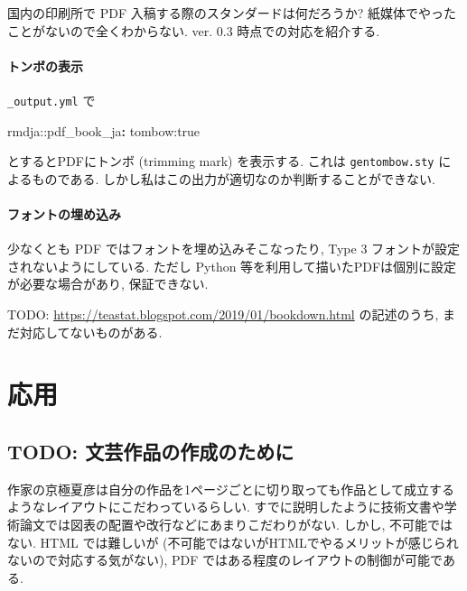 \documentclass[
  nomag]{bxjsbook}
\newenvironment{Shaded}{\begin{snugshade}}{\end{snugshade}}
\newcommand{\AttributeTok}[1]{\textcolor[rgb]{0.77,0.63,0.00}{#1}}
\newcommand{\FunctionTok}[1]{\textcolor[rgb]{0.00,0.00,0.00}{#1}}
\newcommand{\KeywordTok}[1]{\textcolor[rgb]{0.13,0.29,0.53}{\textbf{#1}}}
\theoremstyle{definition}
\theoremstyle{definition}
\theoremstyle{definition}
\theoremstyle{remark}
\begin{document}
国内の印刷所で PDF 入稿する際のスタンダードは何だろうか?
紙媒体でやったことがないので全くわからない. ver. 0.3
時点での対応を紹介する.

\hypertarget{ux30c8ux30f3ux30dcux306eux8868ux793a}{%
\subsection{トンボの表示}\label{ux30c8ux30f3ux30dcux306eux8868ux793a}}

\texttt{\_output.yml} で

\begin{Shaded}
\begin{Highlighting}[]
\AttributeTok{rmdja:}\FunctionTok{:pdf\_book\_ja}\KeywordTok{:}
\AttributeTok{  tombow:true}
\end{Highlighting}
\end{Shaded}

とするとPDFにトンボ (trimming mark) を表示する. これは
\texttt{gentombow.sty} によるものである.
しかし私はこの出力が適切なのか判断することができない.

\hypertarget{ux30d5ux30a9ux30f3ux30c8ux306eux57cbux3081ux8fbcux307f}{%
\subsection{フォントの埋め込み}\label{ux30d5ux30a9ux30f3ux30c8ux306eux57cbux3081ux8fbcux307f}}

少なくとも PDF ではフォントを埋め込みそこなったり, Type 3
フォントが設定されないようにしている. ただし Python
等を利用して描いたPDFは個別に設定が必要な場合があり, 保証できない.

TODO: \url{https://teastat.blogspot.com/2019/01/bookdown.html}
の記述のうち, まだ対応してないものがある.

\hypertarget{part-ux5fdcux7528}{%
\part{応用}\label{part-ux5fdcux7528}}

\hypertarget{todo-ux6587ux82b8ux4f5cux54c1ux306eux4f5cux6210ux306eux305fux3081ux306b}{%
\chapter{TODO:
文芸作品の作成のために}\label{todo-ux6587ux82b8ux4f5cux54c1ux306eux4f5cux6210ux306eux305fux3081ux306b}}

作家の京極夏彦は自分の作品を1ページごとに切り取っても作品として成立するようなレイアウトにこだわっているらしい.
すでに説明したように技術文書や学術論文では図表の配置や改行などにあまりこだわりがない.
しかし, 不可能ではない. HTML では難しいが
(不可能ではないがHTMLでやるメリットが感じられないので対応する気がない),
PDF ではある程度のレイアウトの制御が可能である.
\end{document}
